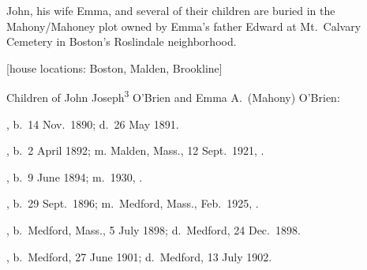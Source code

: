John, his wife Emma, and several of their children are buried in the Mahony/Mahoney plot owned by Emma's father Edward at Mt.\ Calvary Cemetery in Boston's Roslindale neighborhood.\cite{John3OBrienBurial}

[house locations: Boston, Malden, Brookline]

\begin{KidsIntro}
	Children of John Joseph\textsuperscript{3} O'Brien and Emma A.\ (Mahony) O'Brien:
\end{KidsIntro}

\begin{Kids}
	, b.\ 14 Nov.\ 1890;\cite{Mildred4OBrienBirth} d.\ 26 May 1891.\cite{Mildred4OBrienDeath}
	
	, b.\ 2 April 1892; m. Malden, Mass., 12 Sept.\ 1921, .
	
	, b.\ 9 June 1894; m.\ 1930, .
		
	, b.\ 29 Sept.\ 1896; m.\ Medford, Mass., Feb.\ 1925, .
	
	, b.\ Medford, Mass., 5 July 1898;\cite{Edward4OBrienBirth} d.\ Medford, 24 Dec.\ 1898.\cite{Edward4OBrienDeath}
	
	, b.\ Medford, 27 June 1901;\cite{Almyra4OBrienBirth} d.\ Medford, 13 July 1902.\cite{Almyra4OBrienDeath}
\end{Kids}
